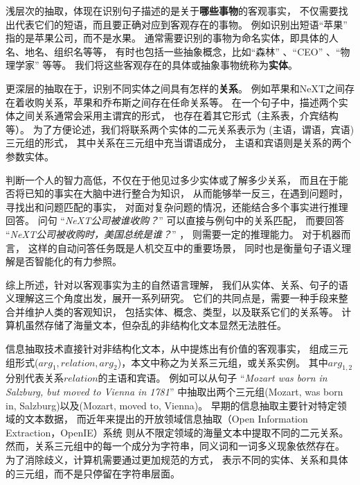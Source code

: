 浅层次的抽取，体现在识别句子描述的是关于\textbf{哪些事物}的客观事实，
不仅需要找出代表它们的短语，而且要正确对应到客观存在的事物。
例如识别出短语``{苹果}'' 指的是苹果公司，而不是水果。
通常需要识别的事物为命名实体，即具体的人名、地名、组织名等等，
有时也包括一些抽象概念，比如``{森林}'' 、``CEO'' 、``{物理学家}'' 等等。
我们将这些客观存在的具体或抽象事物统称为\textbf{实体}。


更深层的抽取在于，识别不同实体之间具有怎样的\textbf{关系}。
例如苹果和NeXT之间存在着收购关系，苹果和乔布斯之间存在任命关系等。
在一个句子中，描述两个实体之间关系通常会采用主谓宾的形式，
也存在着其它形式（主系表，介宾结构等）。
为了方便论述，我们将联系两个实体的二元关系表示为
(主语，谓语，宾语)三元组的形式，
其中关系在三元组中充当谓语成分，
主语和宾语则是关系的两个参数实体。

判断一个人的智力高低，不仅在于他见过多少实体或了解多少关系，
而且在于能否将已知的事实在大脑中进行整合为知识，
从而能够举一反三，在遇到问题时，寻找出和问题匹配的事实，
对面对复杂问题的情况，还能结合多个事实进行推理回答。
问句 ``\textit{NeXT公司被谁收购？}'' 可以直接与例句中的关系匹配，
而要回答 ``\textit{NeXT公司被收购时，美国总统是谁？}'' ，
则需要一定的推理能力。
对于机器而言，
这样的自动问答任务既是人机交互中的重要场景，
同时也是衡量句子语义理解是否智能化的有力参照。


综上所述，针对以客观事实为主的自然语言理解，
我们从实体、关系、句子的语义理解这三个角度出发，展开一系列研究。
它们的共同点是，需要一种手段来整合并维护人类的客观知识，
包括实体、概念、类型，以及联系它们的关系等。
计算机虽然存储了海量文本，但杂乱的非结构化文本显然无法胜任。

信息抽取技术直接针对非结构化文本，从中提炼出有价值的客观事实，
组成三元组形式($arg_1, relation, arg_2$)，本文中称之为关系三元组，或关系实例。
其中$arg_{1,2}$分别代表关系$relation$的主语和宾语。
例如可以从句子
``\textit{Mozart was born in Salzburg, but moved to Vienna in 1781}''
中抽取出两个三元组(Mozart, was born in, Salzburg)以及(Mozart, moved to, Vienna)。
早期的信息抽取主要针对特定领域的文本数据，
而近年来提出的开放领域信息抽取（Open Information Extraction，OpenIE）系统
\cite{carlson2010toward,fader2011identifying,schmitz2012open,nakashole2012patty}
则从不限定领域的海量文本中提取不同的二元关系。
然而，关系三元组中的每一个成分为字符串，同义词和一词多义现象依然存在。
为了消除歧义，计算机需要通过更加规范的方式，
表示不同的实体、关系和具体的三元组，而不是只停留在字符串层面。

